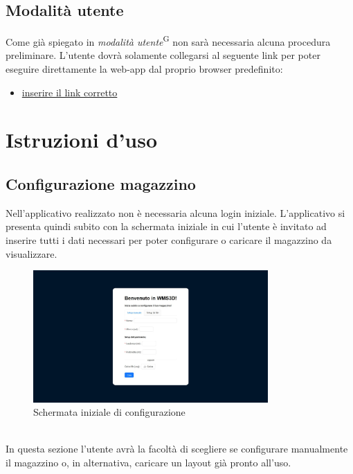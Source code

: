     \subsection{Modalità utente}\label{sec:install_run:user}
    Come già spiegato in \textit{modalità utente}\textsuperscript{G} non sarà necessaria alcuna procedura preliminare. L'utente dovrà solamente collegarsi al seguente link per poter eseguire 
    direttamente la web-app dal proprio browser predefinito: 
    \begin{itemize}
        \item\url{inserire il link corretto}
    \end{itemize}

    \newpage



    
\section{Istruzioni d'uso}\label{sec:Istruzioni_uso}

    \subsection{Configurazione magazzino}\label{sec:creazione}
        Nell'applicativo realizzato non è necessaria alcuna login iniziale. L'applicativo si presenta quindi subito con la schermata iniziale in cui l'utente è 
        invitato ad inserire tutti i dati necessari per poter configurare o caricare il magazzino da visualizzare.
        \begin{figure}[h!]
            \centering
            \includegraphics[width=0.8\textwidth]{images/schermata_iniziale.png}
            \caption{Schermata iniziale di configurazione}
        \end{figure}\\
        \noindent In questa sezione l'utente avrà la facoltà di scegliere se configurare manualmente il magazzino o, in alternativa, caricare un layout già pronto all'uso.

